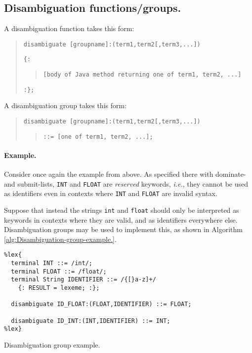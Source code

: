 \documentclass[12pt,english,twoside]{report}
\begin{document}
\subsection{\label{sub:Disambiguation-functions.}Disambiguation functions/groups.}

A disambiguation function takes this form:

\begin{quote}
\texttt{disambiguate {[}groupname]:(term1,term2{[},term3,...])}

\texttt{\{:}
\begin{quote}
\texttt{{[}body of Java method returning one of term1, term2, ...]}
\end{quote}
\texttt{:\};}
\end{quote}
A disambiguation group takes this form:

\begin{quote}
\texttt{disambiguate {[}groupname]:(term1,term2{[},term3,...])}
\begin{quote}
\texttt{::= {[}one of term1, term2, ...];}
\end{quote}
\end{quote}

\paragraph{Example.}

Consider once again the example from above. As specified there with
dominate- and submit-lists, \texttt{INT} and \texttt{FLOAT} are \emph{reserved}
keywords, \emph{i.e.}, they cannot be used as identifiers even in
contexts where \texttt{INT} and \texttt{FLOAT} are invalid syntax.

Suppose that instead the strings \texttt{int} and \texttt{float} should
only be interpreted as keywords in contexts where they are valid,
and as identifiers everywhere else. Disambiguation groups may be used
to implement this, as shown in Algorithm \ref{alg:Disambiguation-group-example.}.

%
\begin{algorithm}
\begin{verbatim}
%lex{
  terminal INT ::= /int/;
  terminal FLOAT ::= /float/;
  terminal String IDENTIFIER ::= /{[}a-z]+/
    {: RESULT = lexeme; :};

  disambiguate ID_FLOAT:(FLOAT,IDENTIFIER) ::= FLOAT;

  disambiguate ID_INT:(INT,IDENTIFIER) ::= INT;
%lex}
\end{verbatim}
\caption{\label{alg:Disambiguation-group-example.}Disambiguation group example.}
\end{algorithm}
\end{document}
